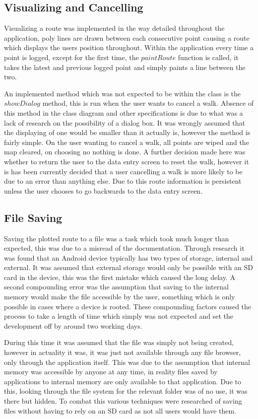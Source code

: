 \subsection{Visualizing and Cancelling}
Visualizing a route was implemented in the way detailed throughout the application, poly lines are drawn between each consecutive point causing a route which displays the users position throughout. Within the application every time a point is logged, except for the first time, the $paintRoute$ function is called, it takes the latest and previous logged point and simply paints a line between the two.

An implemented method which was not expected to be within the class is the $showDialog$ method, this is run when the user wants to cancel a walk. Absence of this method in the class diagram and other specifications is due to what was a lack of research on the possibility of a dialog box. It was wrongly assumed that the displaying of one would be smaller than it actually is, however the method is fairly simple. On the user wanting to cancel a walk, all points are wiped and the map cleared, on choosing no nothing is done. A further decision made here was whether to return the user to the data entry screen to reset the walk, however it is has been currently decided that a user cancelling a walk is more likely to be due to an error than anything else. Due to this route information is persistent unless the user chooses to go backwards to the data entry screen. 

\subsection{File Saving}
Saving the plotted route to a file was a task which took much longer than expected, this was due to a misread of the documentation. Through research it was found that an Android device typically has two types of storage, internal and external. It was assumed that external storage would only be possible with an SD card in the device, this was the first mistake which caused the long delay. A second compounding error was the assumption that saving to the internal memory would make the file accessible by the user, something which is only possible in cases where a device is rooted. These compounding factors caused the process to take a length of time which simply was not expected and set the development off by around two working days. 

During this time it was assumed that the file was simply not being created, however in actuality it was, it was just not available through any file browser, only through the application itself. This was due to the assumption that internal memory was accessible by anyone at any time, in reality files saved by applications to internal memory are only available to that application. Due to this, looking through the file system for the relevant folder was of no use, it was there but hidden. To combat this various techniques were researched of saving files without having to rely on an SD card as not all users would have them. 


